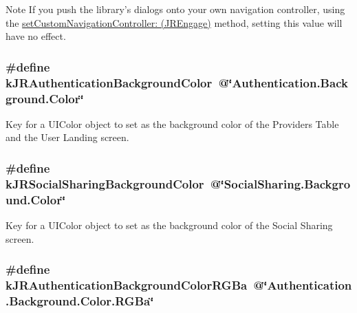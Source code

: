 \begin{DoxyNote}{Note}
If you push the library's dialogs onto your own navigation controller, using the \hyperlink{interface_j_r_engage_a6c704bbff377d20603e6b52bd0ae17f1}{setCustomNavigationController: (JREngage)} method, setting this value will have no effect. 
\end{DoxyNote}
\hypertarget{group__custom_interface_gacfe014997457d27386eff69eb731ce0f}{
\subsubsection[{kJRAuthenticationBackgroundColor}]{\setlength{\rightskip}{0pt plus 5cm}\#define kJRAuthenticationBackgroundColor~@\char`\"{}Authentication.Background.Color\char`\"{}}}
\label{group__custom_interface_gacfe014997457d27386eff69eb731ce0f}
Key for a {\ttfamily UIColor} object to set as the background color of the Providers Table and the User Landing screen. \hypertarget{group__custom_interface_ga404751db179428ee64bbe2fda663efa6}{
\subsubsection[{kJRSocialSharingBackgroundColor}]{\setlength{\rightskip}{0pt plus 5cm}\#define kJRSocialSharingBackgroundColor~@\char`\"{}SocialSharing.Background.Color\char`\"{}}}
\label{group__custom_interface_ga404751db179428ee64bbe2fda663efa6}
Key for a {\ttfamily UIColor} object to set as the background color of the Social Sharing screen. \hypertarget{group__custom_interface_gae0c84a976949aa4eccecc123786efb3c}{
\subsubsection[{kJRAuthenticationBackgroundColorRGBa}]{\setlength{\rightskip}{0pt plus 5cm}\#define kJRAuthenticationBackgroundColorRGBa~@\char`\"{}Authentication.Background.Color.RGBa\char`\"{}}}
